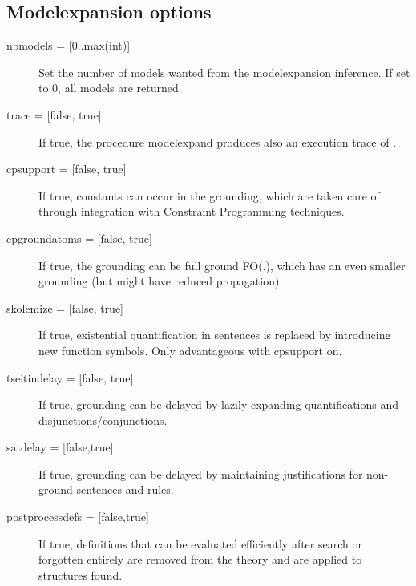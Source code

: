 \subsection{Modelexpansion options}
\begin{description}
	\item[{nbmodels = [0..max(int)]}] Set the number of models wanted from the modelexpansion inference.  If set to 0, all models are returned.
	\item[{trace = [false, true]}] If true, the procedure modelexpand produces also an execution trace of \minisatid.
	\item[{cpsupport = [false, true]}] If true, constants can occur in the grounding, which are taken care of through integration with Constraint Programming techniques. 
	\item[{cpgroundatoms = [false, true]}] If true, the grounding can be full ground FO(.), which has an even smaller grounding (but might have reduced propagation).
	\item[{skolemize = [false, true]}] If true, existential quantification in sentences is replaced by introducing new function symbols. Only advantageous with cpsupport on.
	\item[{tseitindelay = [false, true]}] If true, grounding can be delayed by lazily expanding quantifications and disjunctions/conjunctions.
	\item[{satdelay = [false,true]}] If true, grounding can be delayed by maintaining justifications for non-ground sentences and rules.
	\item[{postprocessdefs = [false,true]}] If true, definitions that can be evaluated efficiently after search or forgotten entirely are removed from the theory and are applied to structures found.
\end{description}

